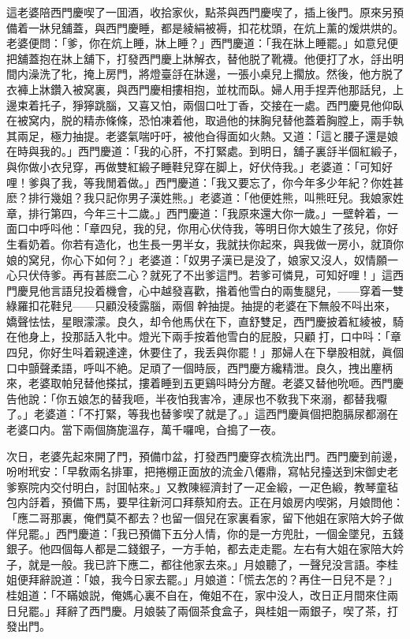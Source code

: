這老婆陪西門慶喫了一囬酒，收拾家伙，點茶與西門慶喫了，插上後門。原來另預備着一牀兒舖蓋，與西門慶睡，都是綾絹被褥，扣花枕頭，在炕上薰的煖烘烘的。老婆便問：「爹，你在炕上睡，牀上睡？」西門慶道：「我在牀上睡罷。」如意兒便把舖蓋抱在牀上舖下，打發西門慶上牀解衣，替他脱了靴襪。他便打了水，㧱出明間内澡洗了牝，掩上房門，將燈臺㧱在牀邊，一張小桌兒上擱放。然後，他方脱了衣褲上牀鑽入被窝裏，與西門慶相摟相抱，並枕而臥。婦人用手捏弄他那話兒，上邊束着托子，猙獰跳腦，又喜又怕，兩個口吐丁香，交接在一處。西門慶見他仰臥在被窝内，脱的精赤條條，恐怕凍着他，取過他的抹胸兒替他蓋着胸膛上，兩手執其兩足，極力抽提。老婆氣喘吁吁，被他㒲得面如火熱。又道：「這と腰子還是娘在時與我的。」西門慶道：「我的心肝，不打緊處。到明日，舖子裏㧱半個紅緞子，與你做小衣兒穿，再做雙紅緞子睡鞋兒穿在脚上，好伏侍我。」老婆道：「可知好哩！爹與了我，等我閒着做。」西門慶道：「我又要忘了，你今年多少年紀？你姓甚麽？排行幾姐？我只記你男子漢姓熊。」老婆道：「他便姓熊，叫熊旺兒。我娘家姓章，排行第四，今年三十二歲。」西門慶道：「我原來還大你一歲。」一壁幹着，一面口中呼呌他：「章四兒，我的兒，你用心伏侍我，等明日你大娘生了孩兒，你好生看奶着。你若有造化，也生長一男半女，我就扶你起來，與我做一房小，就頂你娘的窝兒，你心下如何？」老婆道：「奴男子漢已是没了，娘家又沒人，奴情願一心只伏侍爹。再有甚麽二心？就死了不出爹這門。若爹可憐見，可知好哩！」這西門慶見他言語兒投着機會，心中越發喜歡，揝着他雪白的兩隻腿兒，——穿着一雙綠羅扣花鞋兒——只顧没稜露腦，兩個𢵞幹抽提。抽提的老婆在下無般不呌出來，嬌聲怯怯，星眼濛濛。良久，却令他馬伏在下，直舒雙足，西門慶披着紅綾被，騎在他身上，投那話入牝中。燈光下兩手按着他雪白的屁股，只顧𢵞打，口中呌：「章四兒，你好生呌着親達達，休要住了，我丢與你罷！」那婦人在下擧股相就，眞個口中顫聲柔語，呼叫不絶。足頑了一個時辰，西門慶方纔精泄。良久，拽出麈柄來，老婆取帕兒替他搽拭，摟着睡到五更鷄呌時分方醒。老婆又替他吮咂。西門慶告他說：「你五娘怎的替我咂，半夜怕我害冷，連尿也不敎我下來溺，都替我嚈了。」老婆道：「不打緊，等我也替爹喫了就是了。」這西門慶眞個把胞膈尿都溺在老婆口内。當下兩個旖旎溫存，萬千囉唣，㒲搗了一夜。

次日，老婆先起來開了門，預備巾盆，打發西門慶穿衣梳洗出門。西門慶到前邊，吩咐玳安：「早敎兩名排軍，把捲棚正面放的流金八僊鼎，寫帖兒擡送到宋御史老爹察院内交付明白，討囬帖來。」又教陳經濟封了一疋金緞，一疋色緞，教琴童毡包内㧱着，預備下馬，要早往新河口拜蔡知府去。正在月娘房内喫粥，月娘問他：「應二哥那裏，俺們莫不都去？也留一個兒在家裏看家，留下他姐在家陪大妗子做伴兒罷。」西門慶道：「我已預備下五分人情，你的是一方兜肚，一個金墜兒，五錢銀子。他四個每人都是二錢銀子，一方手帕，都去走走罷。左右有大姐在家陪大妗子，就是一般。我已許下應二，都往他家去來。」月娘聽了，一聲兒没言語。李桂姐便拜辭說道：「娘，我今日家去罷。」月娘道：「慌去怎的？再住一日兒不是？」桂姐道：「不瞞娘説，俺媽心裏不自在，俺姐不在，家中没人，改日正月間來住兩日兒罷。」拜辭了西門慶。月娘裝了兩個茶食盒子，與桂姐一兩銀子，喫了茶，打發出門。

